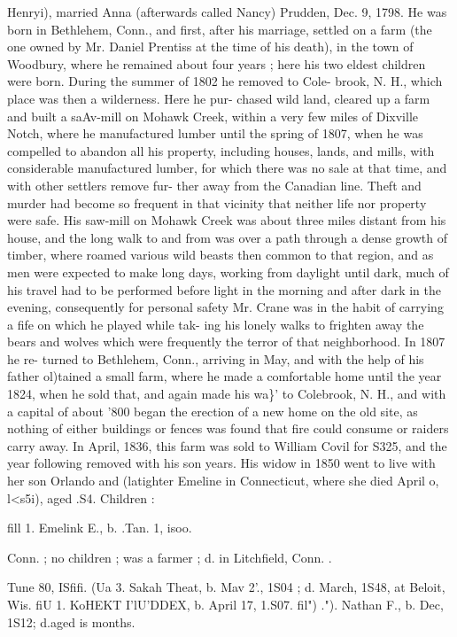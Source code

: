 \documentclass{book}
\begin{document}
Henryi), married Anna (afterwards called Nancy) Prudden, 
Dec. 9, 1798. He was born in Bethlehem, Conn., and first, after 
his marriage, settled on a farm (the one owned by Mr. Daniel 
Prentiss at the time of his death), in the town of Woodbury, 
where he remained about four years ; here his two eldest children 
were born. During the summer of 1802 he removed to Cole- 
brook, N. H., which place was then a wilderness. Here he pur- 
chased wild land, cleared up a farm and built a saAv-mill on 
Mohawk Creek, within a very few miles of Dixville Notch, where 
he manufactured lumber until the spring of 1807, when he was 
compelled to abandon all his property, including houses, lands, 
and mills, with considerable manufactured lumber, for which 
there was no sale at that time, and with other settlers remove fur- 
ther away from the Canadian line. Theft and murder had become 
so frequent in that vicinity that neither life nor property were safe. 
His saw-mill on Mohawk Creek was about three miles distant 
from his house, and the long walk to and from was over a path 
through a dense growth of timber, where roamed various wild 
beasts then common to that region, and as men were expected to 
make long days, working from daylight until dark, much of his 
travel had to be performed before light in the morning and after 
dark in the evening, consequently for personal safety Mr. Crane 
was in the habit of carrying a fife on which he played while tak- 
ing his lonely walks to frighten away the bears and wolves which 
were frequently the terror of that neighborhood. In 1807 he re- 
turned to Bethlehem, Conn., arriving in May, and with the help 
of his father ol)tained a small farm, where he made a comfortable 
home until the year 1824, when he sold that, and again made his 
wa\}' to Colebrook, N. H., and with a capital of about '800 began 
the erection of a new home on the old site, as nothing of either 
buildings or fences was found that fire could consume or raiders 
carry away. In April, 1836, this farm was sold to William 
Covil for S325, and the year following removed with his son 
years. His widow in 1850 went to live with her son Orlando and 
(latighter Emeline in Connecticut, where she died April o, l<s5i), 
aged .S4. Children : 

fill 1. Emelink E., b. .Tan. 1, isoo. 


Conn. ; no children ; was a farmer ; d. in Litchfield, Conn. . 

Tune 80, ISfifi. 
(Ua 3. Sakah Theat, b. Mav 2'., 1S04 ; d. March, 1S48, at Beloit, Wis. 
fiU 1. KoHEKT I'lU'DDEX, b. April 17, 1.S07. 
fil")  ."). Nathan F., b. Dec, 1S12; d.aged is months. 
\end{document}
